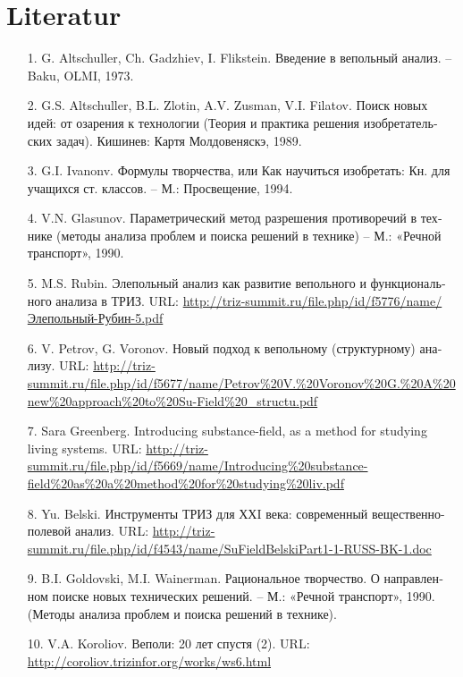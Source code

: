 \documentclass[11pt,a4paper]{article}
\begin{document}
\section*{Literatur}
\begin{itemize}
\item[1.] G. Altschuller, Ch. Gadzhiev,
  I. Flikstein. \foreignlanguage{russian}{Введение в вепольный анализ}. –
  Baku, OLMI, 1973.
\item[2.] G.S. Altschuller, B.L. Zlotin, A.V. Zusman, V.I. Filatov.
  \foreignlanguage{russian}{Поиск новых идей: от озарения к технологии (Теория
    и практика решения изобретательских задач). Кишинев: Картя Молдовеняскэ,
    1989}.
\item[3.] G.I. Ivanonv. \foreignlanguage{russian}{Формулы творчества, или Как
  научиться изобретать: Кн.  для учащихся ст. классов. – М.: Просвещение},
  1994.
\item[4.] V.N. Glasunov. \foreignlanguage{russian}{Параметрический метод
  разрешения противоречий в технике (методы анализа проблем и поиска решений в
  технике) – М.: «Речной транспорт», 1990}.
\item[5.] M.S. Rubin. \foreignlanguage{russian}{Элепольный анализ как развитие
  вепольного и функционального анализа в ТРИЗ}. URL:
  \url{http://triz-summit.ru/file.php/id/f5776/name/Элепольный-Рубин-5.pdf}
\item[6.] V. Petrov, G. Voronov. \foreignlanguage{russian}{Новый подход к
  вепольному (структурному) анализу}. URL:
  \url{http://triz-summit.ru/file.php/id/f5677/name/Petrov%20V.%20Voronov%20G.%20A%20new%20approach%20to%20Su-Field%20_structu.pdf} 
\item[7.] Sara Greenberg. Introducing substance-field, as a method for
  studying living systems. URL:
  \url{http://triz-summit.ru/file.php/id/f5669/name/Introducing%20substance-field%20as%20a%20method%20for%20studying%20liv.pdf}
\item[8.] Yu. Belski. \foreignlanguage{russian}{Инструменты ТРИЗ для ХХI века:
  современный вещественно-полевой анализ}. URL:
  \url{http://triz-summit.ru/file.php/id/f4543/name/SuFieldBelskiPart1-1-RUSS-BK-1.doc}
\item[9.] B.I. Goldovski, M.I. Wainerman.
  \foreignlanguage{russian}{Рациональное творчество. О направленном поиске
    новых технических решений. – М.: «Речной транспорт», 1990. (Методы анализа
    проблем и поиска решений в технике).}
\item[10.] V.A. Koroliov.  \foreignlanguage{russian}{Веполи: 20 лет спустя
  (2)}.  URL: \url{http://coroliov.trizinfor.org/works/ws6.html}

\end{itemize}
\end{document}
